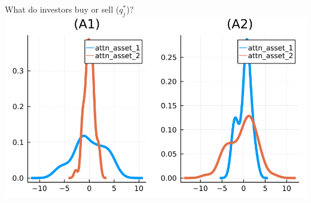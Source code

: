 \documentclass[
  ignorenonframetext,
]{beamer}
\begin{document}
\begin{frame}{What do investors buy or sell (\(q_j^*\))?}
\includegraphics[width=0.4\paperwidth]{complexity_files/figure-beamer/unnamed-chunk-18-4}
\end{frame}
\end{document}
